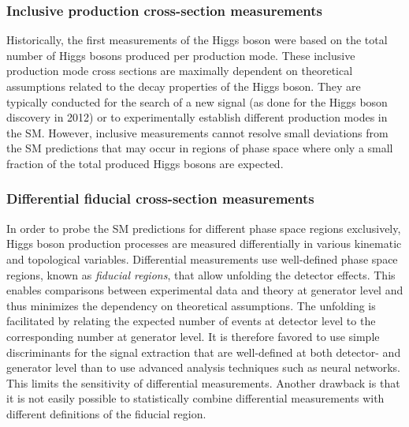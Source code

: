 
\subsubsection{Inclusive production cross-section measurements}
Historically, the first measurements of the Higgs boson were based on the total number of Higgs bosons produced per production mode.
These inclusive production mode cross sections are maximally dependent on theoretical assumptions related to the decay properties of the Higgs boson.
They are typically conducted for the search of a new signal (as done for the Higgs boson discovery in 2012) or to experimentally establish different production modes in the SM.
However, inclusive measurements cannot resolve small deviations from the SM predictions that may occur in regions of phase space where only a small fraction of the total produced Higgs bosons are expected.

\subsubsection{Differential fiducial cross-section measurements}
In order to probe the SM predictions for different phase space regions exclusively, Higgs boson production processes are measured differentially in various kinematic and topological variables.
Differential measurements use well-defined phase space regions, known as \emph{fiducial regions}, that allow unfolding the detector effects. 
This enables comparisons between experimental data and theory at generator level and thus minimizes the dependency on theoretical assumptions. 
The unfolding is facilitated by relating the expected number of events at detector level to the corresponding number at generator level. It is therefore favored to use simple discriminants for the signal extraction that are well-defined at both detector- and generator level than to use advanced analysis techniques such as neural networks. 
This limits the sensitivity of differential measurements.
Another drawback is that it is not easily possible to statistically combine differential measurements with different definitions of the fiducial region.  


